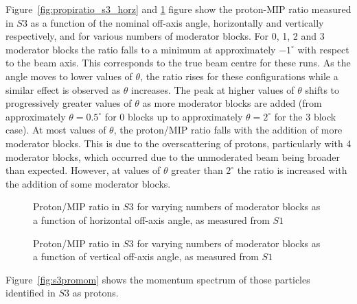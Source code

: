 	Figure~\ref{fig:propiratio_s3_horz} and \ref{fig:propiratio_s3_vert} figure show the proton-MIP ratio measured in $S3$ as a function of the nominal off-axis angle, horizontally and vertically respectively, and for various numbers of moderator blocks.
	For 0, 1, 2 and 3 moderator blocks the ratio falls to a minimum at approximately $-1^{\circ}$ with respect to the beam axis. This corresponds to the true beam centre for these runs.
	As the angle moves to lower values of $\theta$, the ratio rises for these configurations while a similar effect is observed as $\theta$ increases.
	The peak at higher values of $\theta$ shifts to progressively greater values of $\theta$ as more moderator blocks are added (from approximately $\theta = 0.5^{\circ}$ for 0 blocks up to approximately $\theta = 2^{\circ}$ for the 3 block case).
	At most values of $\theta$, the proton/MIP ratio falls with the addition of more moderator blocks. 
	This is due to the overscattering of protons, particularly with 4 moderator blocks, which occurred due to the unmoderated beam being broader than expected.
	However, at values of $\theta$ greater than $2^{\circ}$ the ratio is increased with the addition of some moderator blocks.
	
	\begin{figure}[!ht]
		\begin{minipage}[t]{0.48\textwidth}
			\begin{adjustbox}{max totalsize={\textwidth}{.35\textheight}, center}
				
			\end{adjustbox}
			\caption{Proton/MIP ratio in $S3$ for varying numbers of moderator blocks as a function of horizontal off-axis angle, as measured from $S1$}
			\label{fig:propiratio_s3_horz}
		\end{minipage}
		\hspace{0.3cm}
		\begin{minipage}[t]{0.48\textwidth}
			\begin{adjustbox}{max totalsize={\textwidth}{.35\textheight}, center}
				
			\end{adjustbox}
			\caption{Proton/MIP ratio in $S3$ for varying numbers of moderator blocks as a function of vertical off-axis angle, as measured from $S1$}
			\label{fig:propiratio_s3_vert}
		\end{minipage}	
	\end{figure}

	Figure~\ref{fig:s3promom} shows the momentum spectrum of those particles identified in $S3$ as protons.

